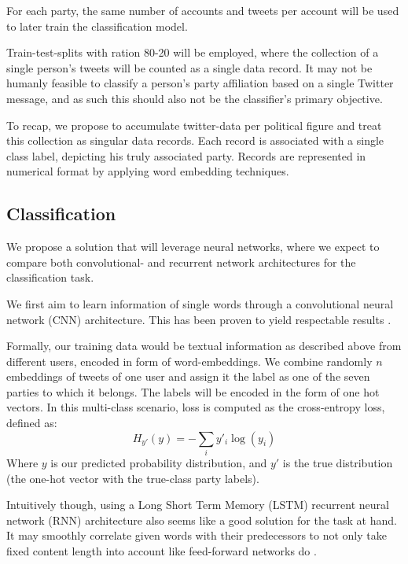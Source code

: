 \documentclass[10pt, oneside]{article}
\begin{document}
\begin{multicols}{2}
For each party, the same number of accounts and tweets per account will be used to later train the classification model.

Train-test-splits with ration 80-20 will be employed, where the collection of a single person's tweets will be counted as a single data record. It may not be humanly feasible to classify a person's party affiliation based on a single Twitter message, and as such this should also not be the classifier's primary objective.

To recap, we propose to accumulate twitter-data per political figure and treat this collection as singular data records. Each record is associated with a single class label, depicting his truly associated party. Records are represented in numerical format by applying word embedding techniques. 

\subsection{Classification}

We propose a solution that will leverage neural networks, where we expect to compare both convolutional- and recurrent network architectures for the classification task.

We first aim to learn information of single words through a convolutional neural network (CNN) architecture. This has been proven to yield respectable results \cite{Kim2014}.

Formally, our training data would be textual information as described above from different users, encoded in form of word-embeddings. We combine randomly $n$ embeddings of tweets of one user and assign it the label as one of the seven parties to which it belongs. The labels will be encoded in the form of one hot vectors. In this multi-class scenario, loss is computed as the cross-entropy loss, defined as:
\begin{equation}
H_{y'}(y) = - \sum_{i} y'_{i} \log (y_{i})
\end{equation}
Where $y$ is our predicted probability distribution, and $y'$ is the true distribution (the one-hot vector with the true-class party labels). 

Intuitively though, using a Long Short Term Memory (LSTM) recurrent neural network (RNN) architecture also seems like a good solution for the task at hand. It may smoothly correlate given words with their predecessors to not only take fixed content length into account like feed-forward networks do \cite{Sundermeyer2012lstm}.


\end{multicols}
\end{document}
